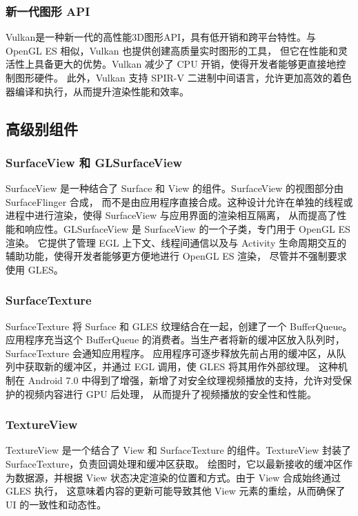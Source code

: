 \subsubsection{新一代图形 API}
Vulkan\cite{sellers2016vulkan,kenwright2017getting}是一种新一代的高性能3D图形API，具有低开销和跨平台特性。与 OpenGL ES 相似，Vulkan 也提供创建高质量实时图形的工具，
但它在性能和灵活性上具备更大的优势。Vulkan 减少了 CPU 开销，使得开发者能够更直接地控制图形硬件。
此外，Vulkan 支持 SPIR-V 二进制中间语言，允许更加高效的着色器编译和执行，从而提升渲染性能和效率。

\subsection{高级别组件}

\subsubsection{SurfaceView 和 GLSurfaceView}
SurfaceView 是一种结合了 Surface 和 View 的组件。SurfaceView 的视图部分由 SurfaceFlinger 合成，
而不是由应用程序直接合成。这种设计允许在单独的线程或进程中进行渲染，使得 SurfaceView 与应用界面的渲染相互隔离，
从而提高了性能和响应性。GLSurfaceView 是 SurfaceView 的一个子类，专门用于 OpenGL ES 渲染。
它提供了管理 EGL 上下文、线程间通信以及与 Activity 生命周期交互的辅助功能，使得开发者能够更方便地进行 OpenGL ES 渲染，
尽管并不强制要求使用 GLES。

\subsubsection{SurfaceTexture}
SurfaceTexture 将 Surface 和 GLES 纹理结合在一起，创建了一个 BufferQueue。
应用程序充当这个 BufferQueue 的消费者。当生产者将新的缓冲区放入队列时，SurfaceTexture 会通知应用程序。
应用程序可逐步释放先前占用的缓冲区，从队列中获取新的缓冲区，并通过 EGL 调用，使 GLES 将其用作外部纹理。
这种机制在 Android 7.0 中得到了增强，新增了对安全纹理视频播放的支持，允许对受保护的视频内容进行 GPU 后处理，
从而提升了视频播放的安全性和性能。

\subsubsection{TextureView}
TextureView 是一个结合了 View 和 SurfaceTexture 的组件。TextureView 封装了 SurfaceTexture，负责回调处理和缓冲区获取。
绘图时，它以最新接收的缓冲区作为数据源，并根据 View 状态决定渲染的位置和方式。由于 View 合成始终通过 GLES 执行，
这意味着内容的更新可能导致其他 View 元素的重绘，从而确保了 UI 的一致性和动态性。

